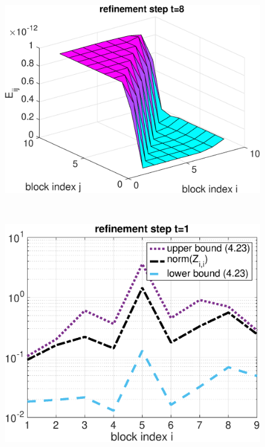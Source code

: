 \begin{example}
{\begin{figure}[h!]
\begin{minipage}[t]{0.48\linewidth}
\includegraphics[width=0.99\linewidth]{figures/9times9_Z3_Error_t8.eps}
\end{minipage}
\\\vspace{3em}
\begin{minipage}[t]{0.48\linewidth}
\centering
\includegraphics[width=0.99\linewidth]{figures/9times9_Z3_Bounds_t1.eps}
\end{minipage}
%
\begin{minipage}[t]{0.48\linewidth}

\end{minipage}
\end{figure}}
\end{example}
